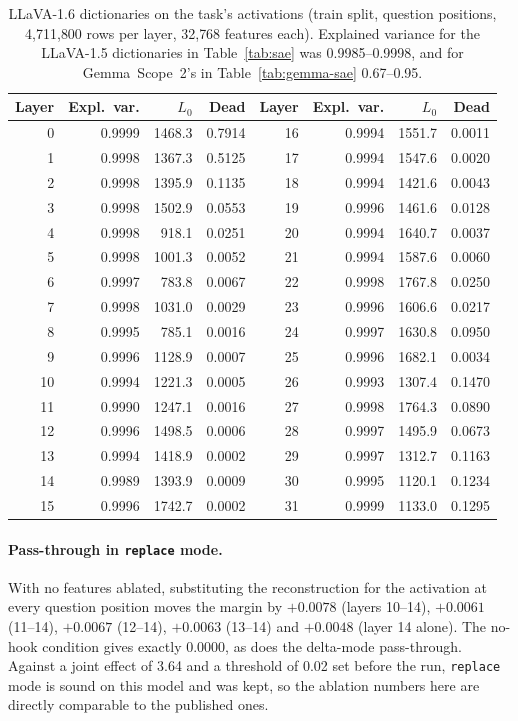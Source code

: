 \documentclass[11pt,a4paper]{article}
\begin{document}
\begin{table}[h]
  \centering
  \caption{LLaVA-1.6 dictionaries on the task's activations (train split,
  question positions, 4{,}711{,}800 rows per layer, 32{,}768 features each).
  Explained variance for the LLaVA-1.5 dictionaries in Table~\ref{tab:sae} was
  0.9985--0.9998, and for Gemma~Scope~2's in Table~\ref{tab:gemma-sae}
  0.67--0.95.}
  \label{tab:llava16-sae}
  \small
  \begin{tabular}{rrrr@{\hskip 1.5em}rrrr}
    \toprule
    Layer & Expl.\ var. & $L_0$ & Dead & Layer & Expl.\ var. & $L_0$ & Dead \\
    \midrule
     0 & 0.9999 & 1468.3 & 0.7914 & 16 & 0.9994 & 1551.7 & 0.0011 \\
     1 & 0.9998 & 1367.3 & 0.5125 & 17 & 0.9994 & 1547.6 & 0.0020 \\
     2 & 0.9998 & 1395.9 & 0.1135 & 18 & 0.9994 & 1421.6 & 0.0043 \\
     3 & 0.9998 & 1502.9 & 0.0553 & 19 & 0.9996 & 1461.6 & 0.0128 \\
     4 & 0.9998 &  918.1 & 0.0251 & 20 & 0.9994 & 1640.7 & 0.0037 \\
     5 & 0.9998 & 1001.3 & 0.0052 & 21 & 0.9994 & 1587.6 & 0.0060 \\
     6 & 0.9997 &  783.8 & 0.0067 & 22 & 0.9998 & 1767.8 & 0.0250 \\
     7 & 0.9998 & 1031.0 & 0.0029 & 23 & 0.9996 & 1606.6 & 0.0217 \\
     8 & 0.9995 &  785.1 & 0.0016 & 24 & 0.9997 & 1630.8 & 0.0950 \\
     9 & 0.9996 & 1128.9 & 0.0007 & 25 & 0.9996 & 1682.1 & 0.0034 \\
    10 & 0.9994 & 1221.3 & 0.0005 & 26 & 0.9993 & 1307.4 & 0.1470 \\
    11 & 0.9990 & 1247.1 & 0.0016 & 27 & 0.9998 & 1764.3 & 0.0890 \\
    12 & 0.9996 & 1498.5 & 0.0006 & 28 & 0.9997 & 1495.9 & 0.0673 \\
    13 & 0.9994 & 1418.9 & 0.0002 & 29 & 0.9997 & 1312.7 & 0.1163 \\
    14 & 0.9989 & 1393.9 & 0.0009 & 30 & 0.9995 & 1120.1 & 0.1234 \\
    15 & 0.9996 & 1742.7 & 0.0002 & 31 & 0.9999 & 1133.0 & 0.1295 \\
    \bottomrule
  \end{tabular}
\end{table}

\paragraph{Pass-through in \texttt{replace} mode.} With no features ablated,
substituting the reconstruction for the activation at every question position
moves the margin by $+0.0078$ (layers 10--14), $+0.0061$ (11--14), $+0.0067$
(12--14), $+0.0063$ (13--14) and $+0.0048$ (layer 14 alone). The no-hook
condition gives exactly $0.0000$, as does the delta-mode pass-through. Against a
joint effect of 3.64 and a threshold of 0.02 set before the run, \texttt{replace}
mode is sound on this model and was kept, so the ablation numbers here are
directly comparable to the published ones.
\end{document}
